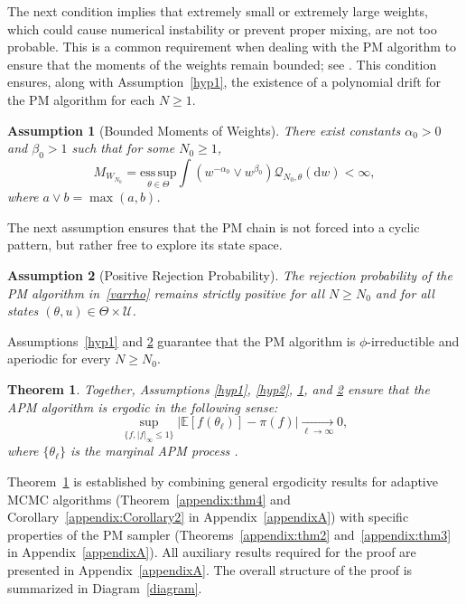\documentclass[pdflatex,sn-mathphys-num]{sn-jnl}
\newcommand{\E}{\mathbb{E}}
\renewcommand{\geq}{\geqslant}
\renewcommand{\leq}{\leqslant}
\theoremstyle{thmstyleone}
\newtheorem{theorem}{Theorem}
\theoremstyle{thmstyletwo}
\theoremstyle{thmstylethree}
\newtheorem{hypothesis}{Assumption}
\begin{document}
The next condition implies that extremely small or extremely large weights, which could cause numerical instability or prevent proper mixing, are not too probable. This is a common requirement when dealing with the PM algorithm to ensure that the moments of the weights remain bounded; see \cite{andrieu_convergence_2015}. This condition ensures, along with Assumption~\ref{hyp1}, the existence of a polynomial drift for the PM algorithm for each $N\geq1$.

\begin{hypothesis}[Bounded Moments of Weights]
There exist constants $\alpha_{0} > 0$ and $\beta_{0} > 1$ such that for some $N_0 \geq 1$,
$$
M_{W_{N_0}} = \underset{\theta \in \Theta}{\mathrm{ess\,sup}} \int (w^{-\alpha_{0}} \vee w^{\beta_{0}}) \mathcal{Q}_{N_0,\theta}(\mathrm{d}w) < \infty,
$$
where $a\vee b=\max(a,b)$.
\label{hyp3}
\end{hypothesis}

The next assumption ensures that the PM chain is not forced into a cyclic pattern, but rather free to explore its state space.
\begin{hypothesis}[Positive Rejection Probability]
The rejection probability of the PM algorithm in~\eqref{varrho} remains strictly positive for all $N \geq N_0$ and for all states $(\theta, u) \in \Theta \times \mathcal{U}$. 
\label{hyp4}
\end{hypothesis}
Assumptions~\ref{hyp1} and \ref{hyp4} guarantee that the PM algorithm is $\phi$-irreductible and aperiodic for every $N\geq N_0$.

\begin{theorem}
    Together, Assumptions \ref{hyp1}, \ref{hyp2}, \ref{hyp3}, and \ref{hyp4} ensure that the APM algorithm is ergodic in the following sense:
$$
\underset{\{f, |f|_\infty\leq1\}}{\sup} |\E[f(\theta_\ell)]-\pi(f)| \underset{\ell \rightarrow \infty} {\longrightarrow}0,
$$
where $\{\theta_\ell\}$ is the marginal APM process .
\label{thm1}
\end{theorem}

Theorem~\ref{thm1} is established by combining general ergodicity results for adaptive MCMC algorithms (Theorem~\ref{appendix:thm4} and Corollary~\ref{appendix:Corollary2} in Appendix~\ref{appendixA}) with specific properties of the PM sampler (Theorems~\ref{appendix:thm2} and~\ref{appendix:thm3} in Appendix~\ref{appendixA}). All auxiliary results required for the proof are presented in Appendix~\ref{appendixA}. The overall structure of the proof is summarized in Diagram~\ref{diagram}.
\end{document}
